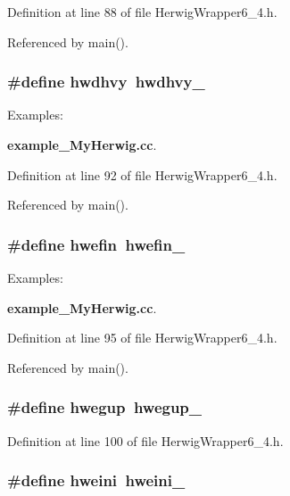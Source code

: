 Definition at line 88 of file Herwig\-Wrapper6\_\-4.h.

Referenced by main().
\subsubsection{\setlength{\rightskip}{0pt plus 5cm}\#define hwdhvy~hwdhvy\_\-}\label{HerwigWrapper6__4_8h_b9574391fca495cf056fd02491e3ee47}


\begin{Desc}
\item[Examples: ]\par
{\bf example\_\-My\-Herwig.cc}.\end{Desc}


Definition at line 92 of file Herwig\-Wrapper6\_\-4.h.

Referenced by main().
\subsubsection{\setlength{\rightskip}{0pt plus 5cm}\#define hwefin~hwefin\_\-}\label{HerwigWrapper6__4_8h_2485ad9a40796cfe5887028c3da2e9e2}


\begin{Desc}
\item[Examples: ]\par
{\bf example\_\-My\-Herwig.cc}.\end{Desc}


Definition at line 95 of file Herwig\-Wrapper6\_\-4.h.

Referenced by main().
\subsubsection{\setlength{\rightskip}{0pt plus 5cm}\#define hwegup~hwegup\_\-}\label{HerwigWrapper6__4_8h_2da34d0c61bb2f8a3d328c7c19112bc8}




Definition at line 100 of file Herwig\-Wrapper6\_\-4.h.
\subsubsection{\setlength{\rightskip}{0pt plus 5cm}\#define hweini~hweini\_\-}\label{HerwigWrapper6__4_8h_77815616249a722e99856600bcec624a}


